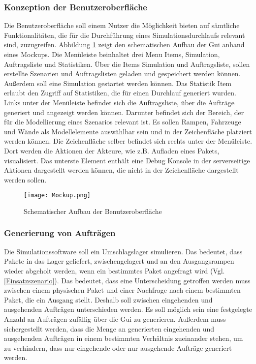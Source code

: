 \subsubsection{Konzeption der Benutzeroberfläche}
Die Benutzeroberfläche soll einem Nutzer die Möglichkeit bieten auf sämtliche Funktionalitäten, die für die Durchführung eines Simulationsdurchlaufs relevant sind, zuzugreifen. Abbildung \ref{GUI} zeigt den schematischen Aufbau der Gui anhand eines Mockups. Die Menüleiste beinhaltet drei Menu Items, Simulation, Auftragsliste und Statistiken. Über die Items Simulation und Auftragsliste, sollen erstellte Szenarien und Auftragslisten geladen und gespeichert werden können. Außerdem soll eine Simulation gestartet werden können. Das Statistik Item erlaubt den Zugriff auf Statistiken, die für einen Durchlauf generiert wurden. Links unter der Menüleiste befindet sich die Auftragsliste, über die Aufträge generiert und angezeigt werden können. Darunter befindet sich der Bereich, der für die Modellierung eines Szenarios relevant ist. Es sollen Rampen, Fahrzeuge und Wände als Modellelemente auswählbar sein und in der Zeichenfläche platziert werden können. Die Zeichenfläche selber befindet sich rechts unter der Menüleiste. Dort werden die Aktionen der Akteure, wie z.B. Aufladen eines Pakets, visualisiert. Das unterste Element enthält eine Debug Konsole in der serverseitige Aktionen dargestellt werden können, die nicht in der Zeichenfläche dargestellt werden sollen. 
\begin{figure}[h!]
	\centering
		\texttt{[image: Mockup.png]}        
		\caption{Schematischer Aufbau der Benutzeroberfläche}
	\label{GUI}
\end{figure}
\subsubsection{Generierung von Aufträgen}
Die Simulationssoftware soll ein Umschlagslager simulieren. Das bedeutet, dass Pakete in das Lager geliefert, zwischengelagert und an den Ausgangsrampen wieder abgeholt werden, wenn ein bestimmtes Paket angefragt wird (Vgl.\ref{Einsatzszenario}). Das bedeutet, dass eine Unterscheidung getroffen werden muss zwischen einem physischen Paket und einer Nachfrage nach einem bestimmten Paket, die ein Ausgang stellt. Deshalb soll zwischen eingehenden und ausgehenden Aufträgen unterschieden werden. Es soll möglich sein eine festgelegte Anzahl an Aufträgen zufällig über die Gui zu generieren. Außerdem muss sichergestellt werden, dass die Menge an generierten eingehenden und ausgehenden Aufträgen in einem bestimmten Verhältnis zueinander stehen, um zu verhindern, dass nur eingehende oder nur ausgehende Aufträge generiert werden. 
